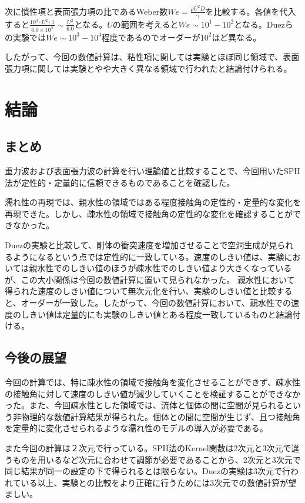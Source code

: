 \documentclass[]{jsarticle}
\begin{document}
次に慣性項と表面張力項の比であるWeber数$We=\frac{\rho U^2 D}{\gamma}$を比較する。各値を代入すると$\frac{10^3\cdot U^2 \cdot 1}{6.0\times10^3}\sim \frac{U^2}{6.0}$となる。$U$の範囲を考えると$We\sim 10^1 -10^2$となる。Duezらの実験では$We\sim10^3-10^4$程度であるのでオーダーが$10^2$ほど異なる。

したがって、今回の数値計算は、粘性項に関しては実験とほぼ同じ領域で、表面張力項に関しては実験とやや大きく異なる領域で行われたと結論付けられる。


\newpage
\section{結論}
\subsection{まとめ}
重力波および表面張力波の計算を行い理論値と比較することで、今回用いたSPH法が定性的・定量的に信頼できるものであることを確認した。

濡れ性の再現では、親水性の領域ではある程度接触角の定性的・定量的な変化を再現できた。しかし、疎水性の領域で接触角の定性的な変化を確認することができなかった。

Duezの実験と比較して、剛体の衝突速度を増加させることで空洞生成が見られるようになるという点では定性的に一致している。速度のしきい値は、実験においては親水性でのしきい値のほうが疎水性でのしきい値より大きくなっているが、この大小関係は今回の数値計算に置いて見られなかった。
親水性において得られた速度のしきい値について無次元化を行い、実験のしきい値と比較すると、オーダーが一致した。したがって、今回の数値計算において、親水性での速度のしきい値は定量的にも実験のしきい値とある程度一致しているものと結論付ける。

\subsection{今後の展望}
今回の計算では、特に疎水性の領域で接触角を変化させることができず、疎水性の接触角に対して速度のしきい値が減少していくことを検証することができなかった。また、今回疎水性とした領域では、流体と個体の間に空間が見られるという非物理的な数値計算結果が得られた。個体との間に空間が生じず、且つ接触角を定量的に変化させられるような濡れ性のモデルの導入が必要である。

また今回の計算は２次元で行っている。SPH法のKernel関数は2次元と3次元で違うものを用いるなど次元に合わせて調節が必要であることから、2次元と3次元で同じ結果が同一の設定の下で得られるとは限らない。Duezの実験は3次元で行われている以上、実験との比較をより正確に行うためには3次元での数値計算が望ましい。
\end{document}
